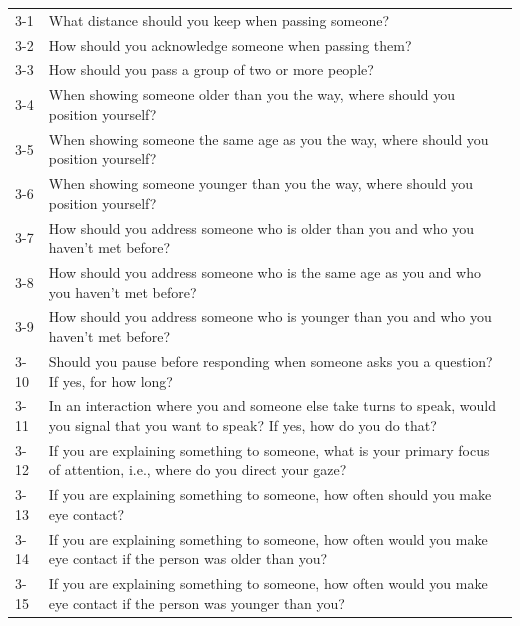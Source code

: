 \documentclass{CSSRforAfrica}
\begin{document}
\begin{table}[H]
\begin{center}
\begin{tabularx}{\linewidth}{|l |X|}
\hline \hline
 {\small 3-1 }  & {\small  What distance should you keep when passing someone?}\\
 {\small 3-2 }  & {\small  How should you acknowledge someone when passing them?}\\
 {\small 3-3 }   & {\small  How should you pass a group of two or more people?}\\
 {\small 3-4 }   & {\small  When showing someone older than you the way, where should you position yourself?}\\
 {\small 3-5 }   & {\small  When showing someone the same age as you the way, where should you position yourself?}\\
 {\small 3-6 }   & {\small  When showing someone younger than you the way, where should you position yourself?}\\
 {\small 3-7}   & {\small How should you address someone who is older than you and who you haven't met before?}\\
 {\small 3-8 }   & {\small  How should you address someone who is the same age as you and who you haven't met before?}\\
 {\small 3-9}    & {\small  How should you address someone who is younger than you and who you haven't met before?}\\
 {\small 3-10} & {\small  Should you pause before responding when someone asks you a question? If yes, for how long?}\\
 {\small 3-11 }  & {\small  In an interaction where you and someone else take turns to speak, would you signal that you want to speak? If yes, how do you do that?}\\
 {\small 3-12 }    & {\small  If you are explaining something to someone, what is your primary focus of attention, i.e., where do you direct your gaze?}\\
 {\small 3-13}  & {\small If you are explaining something to someone, how often should you make eye contact?}\\
 {\small 3-14}    & {\small If you are explaining something to someone, how often would you make eye contact if the person was older than you?}\\
 {\small 3-15}    & {\small If you are explaining something to someone, how often would you make eye contact if the person was younger than you?}\\

\end{tabularx}
\end{center}
\end{table}
\end{document}
